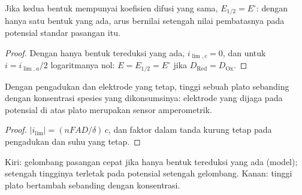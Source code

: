\begin{corollary}\label{cor:b2:current-potential-curves:half-wave}
Jika kedua bentuk mempunyai koefisien difusi yang sama, $E_{1/2} = E^\circ$:
dengan hanya satu bentuk yang ada, arus bernilai setengah nilai
pembatasnya pada potensial standar pasangan itu.
\end{corollary}

\begin{proof}
Dengan hanya bentuk tereduksi yang ada, $i_{\lim,c} = 0$, dan untuk $i = i_{\lim,a}/2$
logaritmanya nol: $E = E_{1/2} = E^\circ$ jika $D_{\text{Red}} = D_{\text{Ox}}$.
\end{proof}

\begin{proposition}\label{prop:b2:current-potential-curves:plateau}
Dengan pengadukan dan elektrode yang tetap, tinggi sebuah plato sebanding
dengan konsentrasi spesies yang dikonsumsinya: elektrode yang dijaga pada
potensial di atas plato merupakan sensor amperometrik.
\end{proposition}

\begin{proof}
$|i_{\lim}| = (nFAD/\delta)\,c$, dan faktor dalam tanda kurung tetap pada
pengadukan dan suhu yang tetap.
\end{proof}

\begin{omfigure}
\hfill
{}

{\small Kiri: gelombang pasangan cepat jika hanya bentuk tereduksi yang ada
(model); setengah tingginya terletak pada potensial setengah gelombang.
Kanan: tinggi plato bertambah sebanding dengan konsentrasi.}
\end{omfigure}

